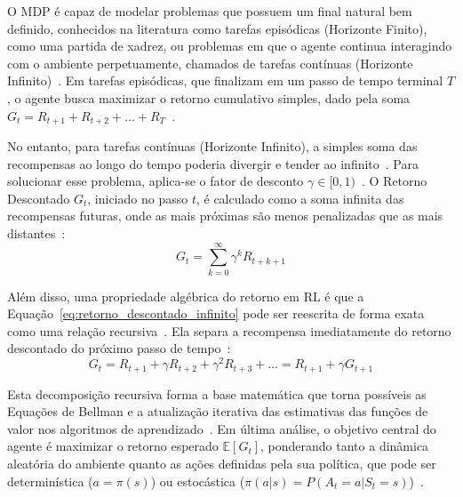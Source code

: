 O \gls{MDP} é capaz de modelar problemas que possuem um final natural bem definido, conhecidos na literatura como tarefas episódicas (Horizonte Finito), como uma partida de xadrez, ou problemas em que o agente continua interagindo com o ambiente perpetuamente, chamados de tarefas contínuas (Horizonte Infinito)~\cite{sutton2018, hu2024}. Em tarefas episódicas, que finalizam em um passo de tempo terminal $T$, o agente busca maximizar o retorno cumulativo simples, dado pela soma $G_t = R_{t+1} + R_{t+2} + \dots + R_T$~\cite{sutton2018}.

No entanto, para tarefas contínuas (Horizonte Infinito), a simples soma das recompensas ao longo do tempo poderia divergir e tender ao infinito~\cite{hu2024, sutton2018}. Para solucionar esse problema, aplica-se o fator de desconto $\gamma \in [0,1)$~\cite{sutton2018, zhao2024}. O Retorno Descontado $G_t$, iniciado no passo $t$, é calculado como a soma infinita das recompensas futuras, onde as mais próximas são menos penalizadas que as mais distantes~\cite{sutton2018}:
\begin{equation} 
G_t = \sum_{k=0}^{\infty} \gamma^k R_{t+k+1} 
\label{eq:retorno_descontado_infinito} 
\end{equation}


Além disso, uma propriedade algébrica do retorno em \gls{RL} é que a Equação~\ref{eq:retorno_descontado_infinito} pode ser reescrita de forma exata como uma relação recursiva~\cite{hu2024, sutton2018}. Ela separa a recompensa imediatamente do retorno descontado do próximo passo de tempo~\cite{sutton2018, hu2024}:
\begin{equation} 
G_t = R_{t+1} + \gamma R_{t+2} + \gamma^2 R_{t+3} + \dots = R_{t+1} + \gamma G_{t+1} 
\label{eq:retorno_recursivo} 
\end{equation}

Esta decomposição recursiva forma a base matemática que torna possíveis as Equações de Bellman e a atualização iterativa das estimativas das funções de valor nos algoritmos de aprendizado~\cite{hu2024, sutton2018}. Em última análise, o objetivo central do agente é maximizar o retorno esperado $\mathbb{E}[G_t]$, ponderando tanto a dinâmica aleatória do ambiente quanto as ações definidas pela sua política, que pode ser determinística ($a = \pi(s)$) ou estocástica ($\pi(a|s) = P(A_t = a | S_t = s)$)~\cite{sutton2018, hu2024}.

